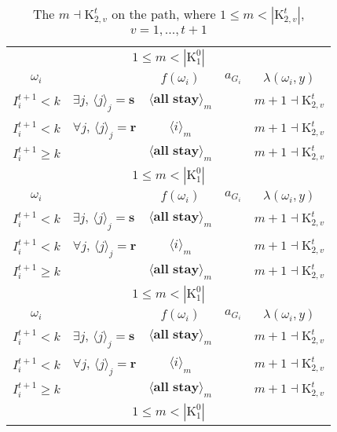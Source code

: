 \documentclass[12pt,letter]{article}
\newcommand{\Kappa}{\mathrm{K}}
\theoremstyle{definition}
\theoremstyle{remark}
\theoremstyle{claim}
\begin{document}
\clearpage



\begin{table}[!htbp]
\caption{The $m\dashv\Kappa^t_{2,v}$ on the path, where $1\leq m<|\Kappa^t_{2,v}|$, $v=1,...,t+1$}
\begin{center}
\begin{tabular}{c l | c | c | c}
\multicolumn{5}{c}{$1\leq m < |\Kappa^0_1|$}\\
$\omega_i$ 	 & 	   &	$f(\omega_i)$  &	$a_{G_i}$ & $\lambda(\omega_i,y)$ \\
\hline
\hline
$I^{t+1}_i< k$  	& 	$\exists j$, $\langle j \rangle_j=\textbf{s}$	& $\langle \textbf{all stay} \rangle_m$		&  	& $m+1\dashv \Kappa^t_{2,v}$\\
$I^{t+1}_i< k$  	& 	$\forall j$, $\langle j \rangle_j=\textbf{r}$	& $\langle i \rangle_m$		&  	& $m+1\dashv \Kappa^t_{2,v}$\\
$I^{t+1}_i\geq k$	 & 				& $\langle \textbf{all stay} \rangle_m$ 	& 		& $m+1\dashv \Kappa^t_{2,v}$\\
\hline
\multicolumn{5}{c}{$1\leq m < |\Kappa^0_1|$}\\
$\omega_i$ 	 & 	   &	$f(\omega_i)$  &	$a_{G_i}$ & $\lambda(\omega_i,y)$ \\
\hline
\hline
$I^{t+1}_i< k$  	& 	$\exists j$, $\langle j \rangle_j=\textbf{s}$	& $\langle \textbf{all stay} \rangle_m$		&  	& $m+1\dashv \Kappa^t_{2,v}$\\
$I^{t+1}_i< k$  	& 	$\forall j$, $\langle j \rangle_j=\textbf{r}$	& $\langle i \rangle_m$		&  	& $m+1\dashv \Kappa^t_{2,v}$\\
$I^{t+1}_i\geq k$	 & 				& $\langle \textbf{all stay} \rangle_m$ 	& 		& $m+1\dashv \Kappa^t_{2,v}$\\
\hline
\multicolumn{5}{c}{$1\leq m < |\Kappa^0_1|$}\\
$\omega_i$ 	 & 	   &	$f(\omega_i)$  &	$a_{G_i}$ & $\lambda(\omega_i,y)$ \\
\hline
\hline
$I^{t+1}_i< k$  	& 	$\exists j$, $\langle j \rangle_j=\textbf{s}$	& $\langle \textbf{all stay} \rangle_m$		&  	& $m+1\dashv \Kappa^t_{2,v}$\\
$I^{t+1}_i< k$  	& 	$\forall j$, $\langle j \rangle_j=\textbf{r}$	& $\langle i \rangle_m$		&  	& $m+1\dashv \Kappa^t_{2,v}$\\
$I^{t+1}_i\geq k$	 & 				& $\langle \textbf{all stay} \rangle_m$ 	& 		& $m+1\dashv \Kappa^t_{2,v}$\\
\hline
\multicolumn{5}{c}{$1\leq m < |\Kappa^0_1|$}\\

\end{tabular}
\end{center}
\end{table}
\end{document}
